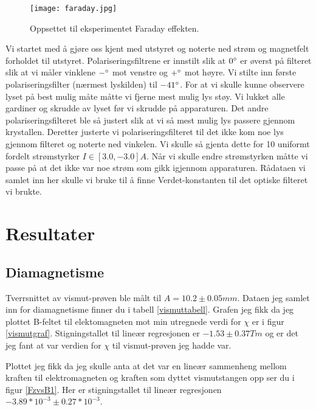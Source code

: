 \documentclass[norsk,a4paper,12pt]{article}
\begin{document}
 \begin{figure}[h!]
	\begin{center}
  	\texttt{[image: faraday.jpg]}\\
	\caption[Oppsett til Faraday effekten]{Oppsettet til eksperimentet Faraday effekten.}
	\label{faradayeff}
	\end{center}
\end{figure}

Vi startet med å gjøre oss kjent med utstyret og noterte ned strøm og magnetfelt forholdet til utstyret. Polariseringsfiltrene er innstilt slik at $0\degree$ er øverst på filteret slik at vi måler vinklene $-\degree$ mot venstre og $+\degree$ mot høyre. Vi stilte inn første polariseringsfilter (nærmest lyskilden) til $-41\degree$. For at vi skulle kunne observere lyset på best mulig måte måtte vi fjerne mest mulig lys støy. Vi lukket alle gardiner og skrudde av lyset før vi skrudde på apparaturen. Det andre polariseringsfilteret ble så justert slik at vi så mest mulig lys passere gjennom krystallen. Deretter justerte vi polariseringsfilteret til det ikke kom noe lys gjennom filteret og noterte ned vinkelen. Vi skulle så gjenta dette for 10 uniformt fordelt strømstyrker $I \in [3.0,-3.0]A$. Når vi skulle endre strømstyrken måtte vi passe på at det ikke var noe strøm som gikk igjennom apparaturen. Rådataen vi samlet inn her skulle vi bruke til å finne Verdet-konstanten til det optiske filteret vi brukte.





\section{Resultater}

\subsection{Diamagnetisme}
Tverrsnittet av vismut-prøven ble målt til $A = 10.2 \pm 0.05mm$.
Dataen jeg samlet inn for diamagnetisme finner du i tabell \vref{vismuttabell}. Grafen jeg fikk da jeg plottet B-feltet til elektomagneten mot min utregnede verdi for $\chi$ er i figur \vref{vismutgraf}. Stigningstallet til lineær regresjonen er $-1.53 \pm 0.37 Tm$ og er det jeg fant at var verdien for $\chi$ til vismut-prøven jeg hadde var. 

Plottet jeg fikk da jeg skulle anta at det var en lineær sammenheng mellom kraften til elektromagneten og kraften som dyttet vismutstangen opp ser du i figur \vref{FzvsB1}. Her er stigningstallet til lineær regresjonen $-3.89*10^{-3} \pm 0.27 *10^{-3}$.
\end{document}
